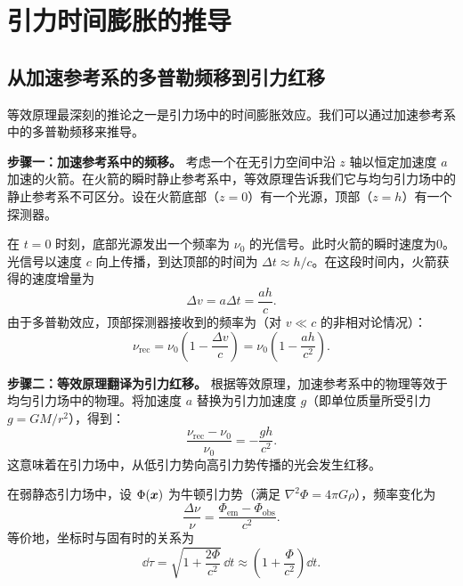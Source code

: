 \section{引力时间膨胀的推导}

\subsection{从加速参考系的多普勒频移到引力红移}

等效原理最深刻的推论之一是引力场中的时间膨胀效应。我们可以通过加速参考系中的多普勒频移来推导。

\textbf{步骤一：加速参考系中的频移。} 考虑一个在无引力空间中沿 $z$ 轴以恒定加速度 $a$ 加速的火箭。在火箭的瞬时静止参考系中，等效原理告诉我们它与均匀引力场中的静止参考系不可区分。设在火箭底部（$z=0$）有一个光源，顶部（$z=h$）有一个探测器。

在 $t=0$ 时刻，底部光源发出一个频率为 $\nu_0$ 的光信号。此时火箭的瞬时速度为0。光信号以速度 $c$ 向上传播，到达顶部的时间为 $\Delta t \approx h/c$。在这段时间内，火箭获得的速度增量为
\begin{equation}
    \Delta v = a \Delta t = \frac{a h}{c}.
\end{equation}
由于多普勒效应，顶部探测器接收到的频率为（对 $v \ll c$ 的非相对论情况）：
\begin{equation}
    \nu_{\text{rec}} = \nu_0 \left(1 - \frac{\Delta v}{c}\right) = \nu_0 \left(1 - \frac{ah}{c^2}\right).
\end{equation}

\textbf{步骤二：等效原理翻译为引力红移。} 根据等效原理，加速参考系中的物理等效于均匀引力场中的物理。将加速度 $a$ 替换为引力加速度 $g$（即单位质量所受引力 $g = GM/r^2$），得到：
\begin{equation}
    \frac{\nu_{\text{rec}} - \nu_0}{\nu_0} = -\frac{g h}{c^2}.
\end{equation}
这意味着在引力场中，从低引力势向高引力势传播的光会发生红移。

\begin{theorem}
在弱静态引力场中，设 $\Phi(\vb*{x})$ 为牛顿引力势（满足 $\nabla^2 \Phi = 4\pi G \rho$），频率变化为
\begin{equation}
    \boxed{\frac{\Delta\nu}{\nu} = \frac{\Phi_{\text{em}} - \Phi_{\text{obs}}}{c^2}}.
\end{equation}
等价地，坐标时与固有时的关系为
\begin{equation}
    \dd\tau = \sqrt{1 + \frac{2\Phi}{c^2}} \, \dd t \approx \left(1 + \frac{\Phi}{c^2}\right) \dd t.
\end{equation}
\end{theorem}

